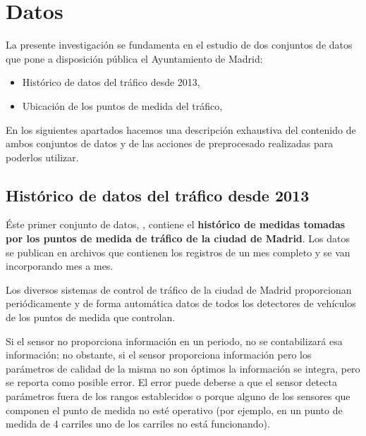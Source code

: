 \documentclass[]{book}
\providecommand{\tightlist}{%
  \setlength{\itemsep}{0pt}\setlength{\parskip}{0pt}}
\begin{document}
  
    
 

\chapter{Datos}\label{datos}

La presente investigación se fundamenta en el estudio de dos conjuntos
de datos que pone a disposición pública el Ayuntamiento de Madrid:

\begin{itemize}
\tightlist
\item
  Histórico de datos del tráfico desde 2013, \citep{metrics2018madrid}
\item
  Ubicación de los puntos de medida del tráfico,
  \citep{locations2018madrid}
\end{itemize}

En los siguientes apartados hacemos una descripción exhaustiva del
contenido de ambos conjuntos de datos y de las acciones de preprocesado
realizadas para poderlos utilizar.

\section{Histórico de datos del tráfico desde
2013}\label{historico-de-datos-del-trafico-desde-2013}

Éste primer conjunto de datos, \citep{metrics2018madrid}, contiene el
\textbf{histórico de medidas tomadas por los puntos de medida de tráfico
de la ciudad de Madrid}. Los datos se publican en archivos que contienen
los registros de un mes completo y se van incorporando mes a mes.

Los diversos sistemas de control de tráfico de la ciudad de Madrid
proporcionan periódicamente y de forma automática datos de todos los
detectores de vehículos de los puntos de medida que controlan.

Si el sensor no proporciona información en un periodo, no se
contabilizará esa información; no obstante, si el sensor proporciona
información pero los parámetros de calidad de la misma no son óptimos la
información se integra, pero se reporta como posible error. El error
puede deberse a que el sensor detecta parámetros fuera de los rangos
establecidos o porque alguno de los sensores que componen el punto de
medida no esté operativo (por ejemplo, en un punto de medida de 4
carriles uno de los carriles no está funcionando).
\end{document}

